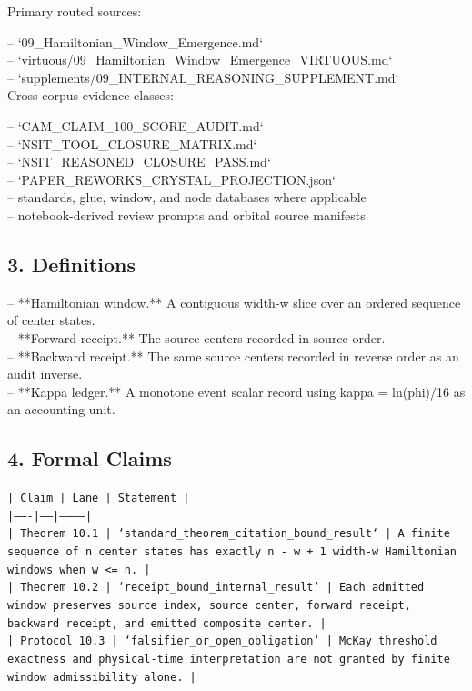 \documentclass[11pt]{article}
\begin{document}
Primary routed sources:

\noindent{}-- `09\_Hamiltonian\_Window\_Emergence.md`\\
\noindent{}-- `virtuous/09\_Hamiltonian\_Window\_Emergence\_VIRTUOUS.md`\\
\noindent{}-- `supplements/09\_INTERNAL\_REASONING\_SUPPLEMENT.md`\\

Cross-corpus evidence classes:

\noindent{}-- `CAM\_CLAIM\_100\_SCORE\_AUDIT.md`\\
\noindent{}-- `NSIT\_TOOL\_CLOSURE\_MATRIX.md`\\
\noindent{}-- `NSIT\_REASONED\_CLOSURE\_PASS.md`\\
\noindent{}-- `PAPER\_REWORKS\_CRYSTAL\_PROJECTION.json`\\
\noindent{}-- standards, glue, window, and node databases where applicable\\
\noindent{}-- notebook-derived review prompts and orbital source manifests\\

\subsection*{3. Definitions}

\noindent{}-- **Hamiltonian window.** A contiguous width-w slice over an ordered sequence of center states.\\
\noindent{}-- **Forward receipt.** The source centers recorded in source order.\\
\noindent{}-- **Backward receipt.** The same source centers recorded in reverse order as an audit inverse.\\
\noindent{}-- **Kappa ledger.** A monotone event scalar record using kappa = ln(phi)/16 as an accounting unit.\\

\subsection*{4. Formal Claims}

\noindent\texttt{| Claim | Lane | Statement |}\\
\noindent\texttt{|-------|------|-----------|}\\
\noindent\texttt{| Theorem 10.1 | `standard\_theorem\_citation\_bound\_result` | A finite sequence of n center states has exactly n - w + 1 width-w Hamiltonian windows when w <= n. |}\\
\noindent\texttt{| Theorem 10.2 | `receipt\_bound\_internal\_result` | Each admitted window preserves source index, source center, forward receipt, backward receipt, and emitted composite center. |}\\
\noindent\texttt{| Protocol 10.3 | `falsifier\_or\_open\_obligation` | McKay threshold exactness and physical-time interpretation are not granted by finite window admissibility alone. |}\\
\end{document}
